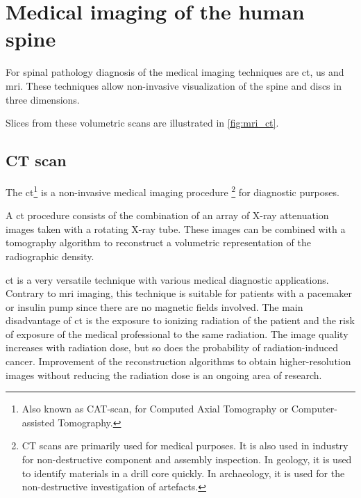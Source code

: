 \section{Medical imaging of the human spine\label{sec:medical_imaging}}


For spinal pathology diagnosis of the  medical imaging techniques are \acrfull{ct}, \acrfull{us} and \acrfull{mri}. 
These techniques allow non-invasive visualization of the spine and discs in three dimensions.

Slices from these volumetric scans are illustrated in \ref{fig:mri_ct}.

\subsection{CT scan}
The \acrfull{ct}\footnote{Also known as CAT-scan, for Computed Axial Tomography or Computer-assisted Tomography.} is a non-invasive medical imaging procedure
\footnote{CT scans are primarily used for medical purposes. 
It is also used in industry for non-destructive component and assembly inspection.
In geology, it is used to identify materials in a drill core quickly. In archaeology, it is used for the non-destructive investigation of artefacts. } 
for diagnostic purposes. 

A \acrlong{ct} procedure consists of the combination of an array of X-ray attenuation images taken with a rotating X-ray tube. 
These images can be combined with a tomography algorithm to reconstruct a volumetric representation of the radiographic density.


\acrshort{ct} is a very versatile technique with various medical diagnostic applications. 
Contrary to \acrfull{mri} imaging, this technique is suitable for patients with a pacemaker or insulin pump since there are no magnetic fields involved.
The main disadvantage of \acrshort{ct} is the exposure to ionizing radiation of the patient and the risk of exposure of the medical professional to the same radiation.
The image quality increases with radiation dose, but so does the probability of radiation-induced cancer.
Improvement of the reconstruction algorithms to obtain higher-resolution images without reducing the radiation dose is an ongoing area of research. 

